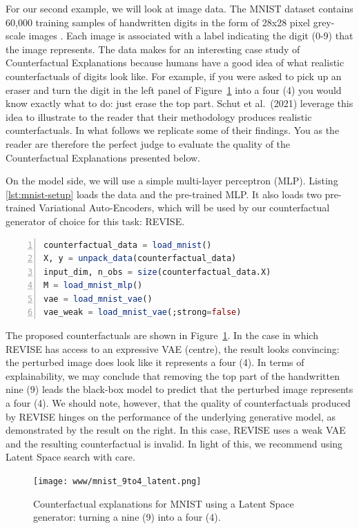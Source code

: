 \documentclass{juliacon}
\begin{document}
For our second example, we will look at image data. The MNIST dataset
contains 60,000 training samples of handwritten digits in the form of
28x28 pixel grey-scale images \cite{lecun1998mnist}. Each image is
associated with a label indicating the digit (0-9) that the image
represents. The data makes for an interesting case study of
Counterfactual Explanations because humans have a good idea of what
realistic counterfactuals of digits look like. For example, if you were
asked to pick up an eraser and turn the digit in the left panel of
Figure~\ref{fig-mnist} into a four (4) you would know exactly what to
do: just erase the top part. Schut et al.~(2021)
\cite{schut2021generating} leverage this idea to illustrate to the
reader that their methodology produces realistic counterfactuals. In
what follows we replicate some of their findings. You as the reader are
therefore the perfect judge to evaluate the quality of the
Counterfactual Explanations presented below.

On the model side, we will use a simple multi-layer perceptron (MLP).
Listing \ref{lst:mnist-setup} loads the data and the pre-trained MLP. It
also loads two pre-trained Variational Auto-Encoders, which will be used
by our counterfactual generator of choice for this task: REVISE.

\begin{lstlisting}[language=Julia, escapechar=@, numbers=left, label={lst:mnist-setup}, caption={}]
counterfactual_data = load_mnist()
X, y = unpack_data(counterfactual_data)
input_dim, n_obs = size(counterfactual_data.X)
M = load_mnist_mlp()
vae = load_mnist_vae()
vae_weak = load_mnist_vae(;strong=false)
\end{lstlisting}

The proposed counterfactuals are shown in Figure~\ref{fig-mnist}. In the
case in which REVISE has access to an expressive VAE (centre), the
result looks convincing: the perturbed image does look like it
represents a four (4). In terms of explainability, we may conclude that
removing the top part of the handwritten nine (9) leads the black-box
model to predict that the perturbed image represents a four (4). We
should note, however, that the quality of counterfactuals produced by
REVISE hinges on the performance of the underlying generative model, as
demonstrated by the result on the right. In this case, REVISE uses a
weak VAE and the resulting counterfactual is invalid. In light of this,
we recommend using Latent Space search with care.

\begin{figure}

{\centering \texttt{[image: www/mnist\_9to4\_latent.png]}

}

\caption{\label{fig-mnist}Counterfactual explanations for MNIST using a
Latent Space generator: turning a nine (9) into a four (4).}

\end{figure}
\end{document}
